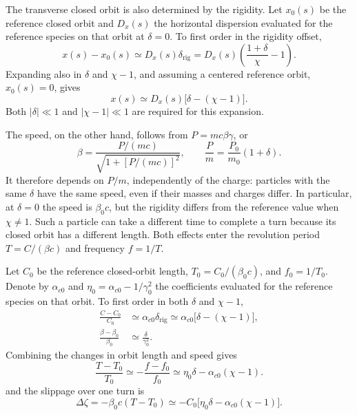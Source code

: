 The transverse closed orbit is also determined by the rigidity. Let $x_0(s)$
be the reference closed orbit and $D_x(s)$ the horizontal dispersion evaluated
for the reference species on that orbit at $\delta=0$. To first order in the
rigidity offset,
\begin{equation}
x(s)-x_0(s)\simeq D_x(s)\delta_{\mathrm{rig}}
=D_x(s)\left(\frac{1+\delta}{\chi}-1\right).
\label{eq:species_closed_orbit_rigidity}
\end{equation}
Expanding also in $\delta$ and $\chi-1$, and assuming a centered reference
orbit, $x_0(s)=0$, gives
\begin{equation}
x(s)\simeq D_x(s)\big[\delta-(\chi-1)\big].
\label{eq:species_closed_orbit_first_order}
\end{equation}
Both $|\delta|\ll1$ and $|\chi-1|\ll1$ are required for this expansion.

The speed, on the other hand, follows from $P=mc\beta\gamma$, or
\begin{equation*}
\beta=\frac{P/(mc)}{\sqrt{1+[P/(mc)]^2}},
\qquad
\frac{P}{m}=\frac{P_0}{m_0}(1+\delta).
\end{equation*}
It therefore depends on $P/m$, independently of the charge: particles with
the same $\delta$ have the same speed, even if their masses and charges differ.
In particular, at $\delta=0$ the speed is $\beta_0 c$, but the rigidity differs
from the reference value when $\chi\ne1$. Such a particle can take a different
time to complete a turn because its closed orbit has a different length.
Both effects enter the revolution period $T=C/(\beta c)$ and frequency $f=1/T$.

Let $C_0$ be the reference closed-orbit length, $T_0=C_0/(\beta_0 c)$, and
$f_0=1/T_0$. Denote by $\alpha_{c0}$ and
$\eta_0=\alpha_{c0}-1/\gamma_0^2$ the coefficients evaluated for the reference
species on that orbit. To first order in both $\delta$ and $\chi-1$,
\begin{align}
\frac{C-C_0}{C_0}
&\simeq\alpha_{c0}\delta_{\mathrm{rig}}
\simeq\alpha_{c0}\big[\delta-(\chi-1)\big],
\\
\frac{\beta-\beta_0}{\beta_0}
&\simeq\frac{\delta}{\gamma_0^2}.
\end{align}
Combining the changes in orbit length and speed gives
\begin{equation}
\boxed{
\frac{T-T_0}{T_0}
\simeq-\frac{f-f_0}{f_0}
\simeq\eta_0\delta-\alpha_{c0}(\chi-1).}
\label{eq:species_revolution_time_offset}
\end{equation}
and the slippage over one turn is
\begin{equation}
\boxed{
\Delta\zeta=-\beta_0 c(T-T_0)
\simeq-C_0\big[\eta_0\delta-\alpha_{c0}(\chi-1)\big].}
\label{eq:species_turn_slippage}
\end{equation}

